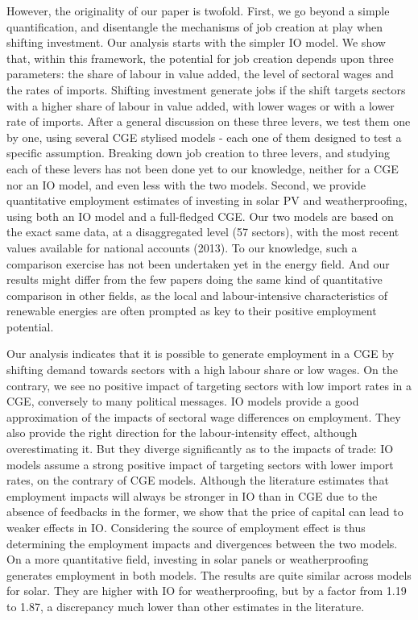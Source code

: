 However, the originality of our paper is twofold. 
First, we go beyond a simple quantification, and disentangle the mechanisms of job creation at play when shifting investment. 
Our analysis starts with the simpler IO model. We show that, within this framework, the potential for job creation depends upon three parameters: the share of labour in value added, the level of sectoral wages and the rates of imports. Shifting investment generate jobs if the shift targets sectors with a higher share of labour in value added, with lower wages or with a lower rate of imports. After a general discussion on these three levers, we test them one by one, using several CGE stylised models - each one of them designed to test a specific assumption.
Breaking down job creation to three levers, and studying each of these levers has not been done yet to our knowledge, neither for a CGE nor an IO model, and even less with the two models.
Second, we provide quantitative employment estimates of investing in solar PV and weatherproofing, using both an IO model and a full-fledged CGE. Our two models are based on the exact same data, at a disaggregated level (57 sectors), with the most recent values available for national accounts (2013). To our knowledge, such a comparison exercise has not been undertaken yet in the energy field. And our results might differ from the few papers doing the same kind of quantitative comparison in other fields, as the local and labour-intensive characteristics of renewable energies are often prompted as key to their positive employment potential.

Our analysis indicates that it is possible to generate employment in a CGE by shifting demand towards sectors with a high labour share or low wages. On the contrary, we see no positive impact of targeting sectors with low import rates in a CGE, conversely to many political messages.
IO models provide a good approximation of the impacts of sectoral wage differences on employment. They also provide the right direction for the labour-intensity effect, although overestimating it. But they diverge significantly as to the impacts of trade: IO models assume a strong positive impact of targeting sectors with lower import rates, on the contrary of CGE models.
Although the literature estimates that employment impacts will always be stronger in IO than in CGE due to the absence of feedbacks in the former, we show that the price of capital can lead to weaker effects in IO. Considering the source of employment effect is thus determining the employment impacts and divergences between the two models.
On a more quantitative field, investing in solar panels or weatherproofing generates employment in both models. The results are quite similar across models for solar. They are higher with IO for weatherproofing, but by a factor from 1.19 to 1.87, a discrepancy much lower than other estimates in the literature. 

